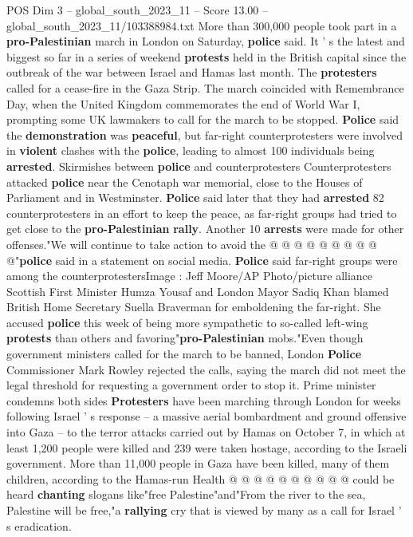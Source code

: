 \begin{textsample}{POS Dim 3 – global\_south\_2023\_11 – Score 13.00 – global\_south\_2023\_11/103388984.txt}  \label{ex:f3_pos_348}
More than 300,000 people took part in a \textbf{pro-Palestinian} march in London on Saturday, \textbf{police} said.
It ' s the latest and biggest so far in a series of weekend \textbf{protests} held in the British capital since the outbreak of the war between Israel and Hamas last month.
The \textbf{protesters} called for a cease-fire in the Gaza Strip.
The march coincided with Remembrance Day, when the United Kingdom commemorates the end of World War I, prompting some UK lawmakers to call for the march to be stopped. \textbf{Police} said the \textbf{demonstration} was \textbf{peaceful}, but far-right counterprotesters were involved in \textbf{violent} clashes with the \textbf{police}, leading to almost 100 individuals being \textbf{arrested}.
Skirmishes between \textbf{police} and counterprotesters Counterprotesters attacked \textbf{police} near the Cenotaph war memorial, close to the Houses of Parliament and in Westminster. \textbf{Police} said later that they had \textbf{arrested} 82 counterprotesters in an effort to keep the peace, as far-right groups had tried to get close to the \textbf{pro-Palestinian} \textbf{rally}.
Another 10 \textbf{arrests} were made for other offenses."We will continue to take action to avoid the @ @ @ @ @ @ @ @ @ @"\textbf{police} said in a statement on social media. \textbf{Police} said far-right groups were among the counterprotestersImage : Jeff Moore/AP Photo/picture alliance Scottish First Minister Humza Yousaf and London Mayor Sadiq Khan blamed British Home Secretary Suella Braverman for emboldening the far-right.
She accused \textbf{police} this week of being more sympathetic to so-called left-wing \textbf{protests} than others and favoring"\textbf{pro-Palestinian} mobs."Even though government ministers called for the march to be banned, London \textbf{Police} Commissioner Mark Rowley rejected the calls, saying the march did not meet the legal threshold for requesting a government order to stop it.
Prime minister condemns both sides \textbf{Protesters} have been marching through London for weeks following Israel ' s response -- a massive aerial bombardment and ground offensive into Gaza -- to the terror attacks carried out by Hamas on October 7, in which at least 1,200 people were killed and 239 were taken hostage, according to the Israeli government.
More than 11,000 people in Gaza have been killed, many of them children, according to the Hamas-run Health @ @ @ @ @ @ @ @ @ @ could be heard \textbf{chanting} slogans like"free Palestine"and"From the river to the sea, Palestine will be free,"a \textbf{rallying} cry that is viewed by many as a call for Israel ' s eradication.

\end{textsample}
